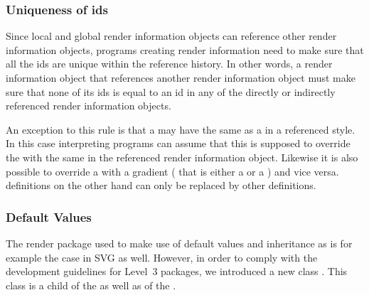 \subsubsection{Uniqueness of ids}
Since local and global render information objects can reference other render information objects, programs creating
render information need to make sure that all the ids are unique within the reference history. In other words, a 
render information object that references another render information object must make sure that none of its ids is equal
to an id in any of the directly or indirectly referenced render information objects. 

An exception to this rule is that a \ColorDefinition may have the same  as a \ColorDefinition in a referenced style. In this case interpreting programs can assume that this \ColorDefinition is supposed to override the \ColorDefinition with the
same  in the referenced render information object. Likewise it is also possible to override a \ColorDefinition with a  gradient ( that is either a \LinearGradient or a \RadialGradient) and vice versa. \LineEnding definitions on the other hand can only be replaced by other \LineEnding definitions.

\subsubsection{Default Values}
\label{defaultvalues-class}
The render package used to make use of default values and inheritance as is for 
example the case in SVG as well. However, in order to comply with the \SBML 
development guidelines for Level~3 packages, we introduced a new class \DefaultValues. 
This class is a child of the \ListOfGlobalRenderInformation as well as of the 
\ListOfLocalRenderInformation. 

